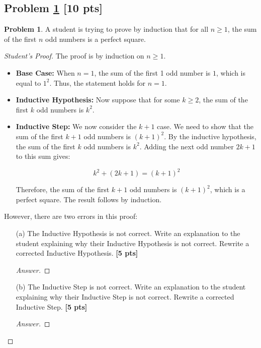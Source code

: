 \documentclass[11pt]{article}
\theoremstyle{definition}
\theoremstyle{definition}
\newtheorem{required}{Problem}
\theoremstyle{definition}
\begin{document}
\subsection{Problem \ref{Induction1} \textbf{[10 pts]}}
\begin{required} \label{Induction1}
A student is trying to prove by induction that for all \( n \geq 1 \), the sum of the first \( n \) odd numbers is a perfect square.

\begin{proof}[Student's Proof]The proof is by induction on \( n \geq 1 \).

\begin{itemize}
    \item \textbf{Base Case:} When \( n = 1 \), the sum of the first 1 odd number is \( 1 \), which is equal to \( 1^2 \). Thus, the statement holds for \( n = 1 \).

    \item \textbf{Inductive Hypothesis:} Now suppose that for some \( k \geq 2 \), the sum of the first \( k \) odd numbers is \( k^2 \).

    \item \textbf{Inductive Step:} We now consider the \( k+1 \) case. We need to show that the sum of the first \( k+1 \) odd numbers is \( (k+1)^2 \). By the inductive hypothesis, the sum of the first \( k \) odd numbers is \( k^2 \). Adding the next odd number \( 2k+1 \) to this sum gives:

\[
k^2 + (2k + 1) = (k + 1)^2
\]

Therefore, the sum of the first \( k+1 \) odd numbers is \( (k + 1)^2 \), which is a perfect square. The result follows by induction.

\end{itemize}

However, there are two errors in this proof:

\begin{enumerate}
    \item[(a)] The Inductive Hypothesis is not correct. Write an explanation to the student explaining why their Inductive Hypothesis is not correct. Rewrite a corrected Inductive Hypothesis. \textbf{[5 pts]}

    \begin{proof}[Answer]
    \end{proof}
    
    \item[(b)] The Inductive Step is not correct. Write an explanation to the student explaining why their Inductive Step is not correct. Rewrite a corrected Inductive Step. \textbf{[5 pts]}
    
    \begin{proof}[Answer]
    \end{proof}
\end{enumerate}

\end{proof}
\end{required}
\end{document}
